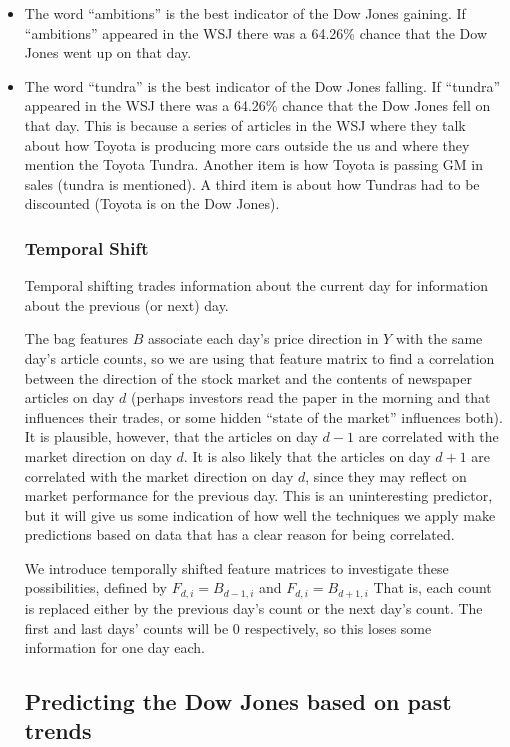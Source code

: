 \documentclass[10pt, twocolumn]{article}
\begin{document}
\begin{itemize}
\item The word ``ambitions'' is the best indicator of the Dow Jones gaining. If ``ambitions'' appeared in the WSJ there was a 64.26\% chance that the Dow Jones went up on that day.
\item The word ``tundra'' is the best indicator of the Dow Jones falling. If ``tundra'' appeared in the WSJ there was a 64.26\% chance that the Dow Jones fell on that day. This is because a series of articles in the WSJ where they talk about how Toyota is producing more cars outside the us and where they mention the Toyota Tundra. Another item is how Toyota is passing GM in sales (tundra is mentioned). A third item is about how Tundras had to be discounted (Toyota is on the Dow Jones).


\subsubsection*{Temporal Shift}
Temporal shifting trades information about the current day for information about the previous (or next) day.


The bag features $B$ associate each day's price direction in $Y$ with the same day's article counts, so we are using that feature matrix to find a correlation between the direction of the stock market and the contents of newspaper articles on day $d$ (perhaps investors read the paper in the morning and that influences their trades, or some hidden ``state of the market'' influences both). It is plausible, however, that the articles on day $d-1$ are correlated with the market direction on day $d$. It is also likely that the articles on day $d+1$ are correlated with the market direction on day $d$, since they may reflect on market performance for the previous day. This is an uninteresting predictor, but it will give us some indication of how well the techniques we apply make predictions based on data that has a clear reason for being correlated.

We introduce temporally shifted feature matrices to investigate these possibilities, defined by $F_{d,i} = B_{d-1,i}$ and $F_{d,i} = B_{d+1,i}$ That is, each count is replaced either by the previous day's count or the next day's count. The first and last days' counts will be 0 respectively, so this loses some information for one day each.

\subsection{Predicting the Dow Jones based on past trends}
\label{dj->dj}


\end{itemize}
\end{document}
